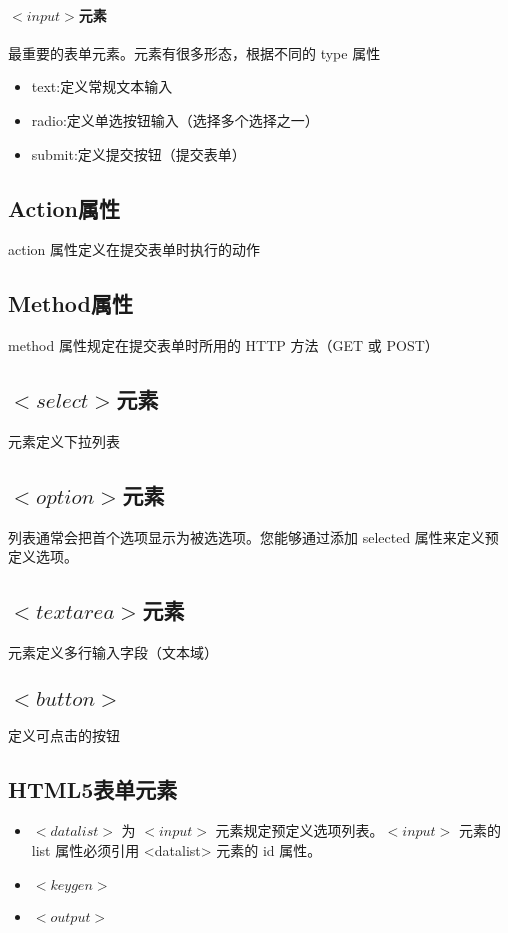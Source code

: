 \documentclass[10pt,UTF8]{ctexart}
\begin{document}
\paragraph{$<input>$元素}最重要的表单元素。元素有很多形态，根据不同的 type 属性
\begin{itemize}
\item text:定义常规文本输入
\item radio:定义单选按钮输入（选择多个选择之一）
\item submit:定义提交按钮（提交表单）
\end{itemize}
\subsection{Action属性}
action 属性定义在提交表单时执行的动作
\subsection{Method属性}
method 属性规定在提交表单时所用的 HTTP 方法（GET 或 POST）
\subsection{$<select>$元素}
元素定义下拉列表
\subsection{$<option>$元素}
列表通常会把首个选项显示为被选选项。您能够通过添加 selected 属性来定义预定义选项。
\subsection{$<textarea>$元素}
元素定义多行输入字段（文本域）
\subsection{$<button>$}
定义可点击的按钮
\subsection{HTML5表单元素}
\begin{itemize}
\item $<datalist>$ 为 $<input>$ 元素规定预定义选项列表。$<input>$ 元素的 list 属性必须引用 <datalist> 元素的 id 属性。
\item $<keygen>$
\item $<output>$
\end{itemize}
\end{document}
